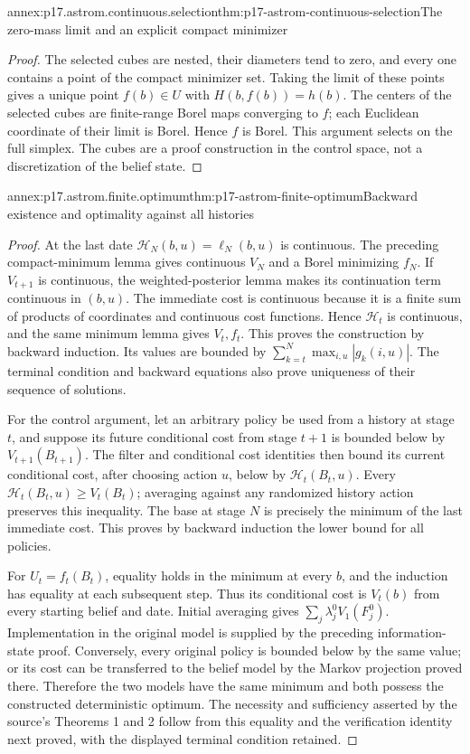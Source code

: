 \begin{annexitem}{annex:p17.astrom.continuous.selection}{thm:p17-astrom-continuous-selection}{The zero-mass limit and an explicit compact minimizer}
\begin{proof}
The selected cubes are nested, their diameters tend to
zero, and every one contains a point of the compact
minimizer set. Taking the limit of these points gives
a unique point \(f(b)\in U\) with \(H(b,f(b))=h(b)\).
The centers of the selected cubes are finite-range
Borel maps converging to \(f\); each Euclidean coordinate
of their limit is Borel. Hence \(f\) is Borel.
This argument selects on the full simplex. The cubes
are a proof construction in the control space, not
a discretization of the belief state.
\end{proof}
\end{annexitem}

\begin{annexitem}{annex:p17.astrom.finite.optimum}{thm:p17-astrom-finite-optimum}{Backward existence and optimality against all histories}
\begin{proof}
At the last date \(\mathcal H_N(b,u)=\ell_N(b,u)\) is continuous.
The preceding compact-minimum lemma gives continuous
\(V_N\) and a Borel minimizing \(f_N\).
If \(V_{t+1}\) is continuous, the weighted-posterior
lemma makes its continuation term continuous in \((b,u)\).
The immediate cost is continuous because it is a
finite sum of products of coordinates and continuous
cost functions. Hence \(\mathcal H_t\) is continuous, and the
same minimum lemma gives \(V_t,f_t\).
This proves the construction by backward induction.
Its values are bounded by
\(\sum_{k=t}^N\max_{i,u}|g_k(i,u)|\).
The terminal condition and backward equations also
prove uniqueness of their sequence of solutions.

For the control argument, let an arbitrary policy be
used from a history at stage \(t\), and suppose its
future conditional cost from stage \(t+1\) is bounded
below by \(V_{t+1}(B_{t+1})\).
The filter and conditional cost identities then bound
its current conditional cost, after choosing action \(u\),
below by \(\mathcal H_t(B_t,u)\).
Every \(\mathcal H_t(B_t,u)\geq V_t(B_t)\); averaging against
any randomized history action preserves this inequality.
The base at stage \(N\) is precisely the minimum of
the last immediate cost. This proves by backward
induction the lower bound for all policies.

For \(U_t=f_t(B_t)\), equality holds in the minimum
at every \(b\), and the induction has equality at each
subsequent step. Thus its conditional cost is \(V_t(b)\)
from every starting belief and date.
Initial averaging gives
\(\sum_j\lambda_j^0V_1(F_j^0)\).
Implementation in the original model is supplied by
the preceding information-state proof. Conversely,
every original policy is bounded below by the same
value; or its cost can be transferred to the belief
model by the Markov projection proved there.
Therefore the two models have the same minimum and
both possess the constructed deterministic optimum.
The necessity and sufficiency asserted by the source's
Theorems 1 and 2 follow from this equality and the
verification identity next proved, with the displayed
terminal condition retained.
\end{proof}
\end{annexitem}

